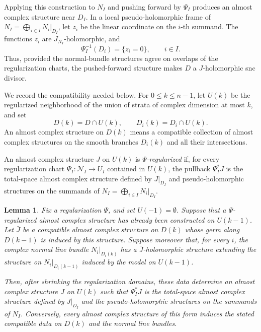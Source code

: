 \documentclass[11pt]{amsart}
\numberwithin{equation}{section}
\theoremstyle{plain}
\newtheorem{lemma}[theorem]{Lemma}
\theoremstyle{definition}
\newcommand{\cN}{\mathcal{N}}
\begin{document}
Applying this construction to $N_I$ and pushing forward by $\Psi_I$ produces
an almost complex structure near $D_I$. In a local pseudo-holomorphic frame of
$N_I=\bigoplus_{i\in I}N_i|_{D_I}$, let $z_i$ be the linear coordinate on the
$i$-th summand. The functions $z_i$ are $J_{N_I}$-holomorphic, and
\[
\Psi_I^{-1}(D_i)=\{z_i=0\},\qquad i\in I.
\]
Thus, provided the normal-bundle structures agree on overlaps of the
regularization charts, the pushed-forward structure makes $D$ a
$J$-holomorphic snc divisor.

We record the compatibility needed below. For $0\le k\le n-1$, let $U(k)$
be the regularized neighborhood of the union of strata of complex dimension
at most $k$, and set
\[
D(k)=D\cap U(k),\qquad D_i(k)=D_i\cap U(k).
\]
An almost complex structure on $D(k)$ means a compatible collection of almost
complex structures on the smooth branches $D_i(k)$ and all their
intersections.

An almost complex structure $J$ on $U(k)$ is
\emph{$\Psi$-regularized} if, for every regularization chart
$\Psi_I:\cN_I\to U_I$ contained in $U(k)$, the pullback $\Psi_I^*J$ is the
total-space almost complex structure defined by $J|_{D_I}$ and
pseudo-holomorphic structures on the summands of
$N_I=\bigoplus_{i\in I}N_i|_{D_I}$.

\begin{lemma}
\label{Lem: regularized local model} Fix a regularization $\Psi$, and set
$U(-1)=\emptyset$. Suppose that a $\Psi$-regularized almost complex structure
has already been constructed on $U(k-1)$. Let $\bar J$ be a compatible almost
complex structure on $D(k)$ whose germ along $D(k-1)$ is induced by this
structure. Suppose moreover that, for every $i$, the complex normal line bundle
$N_i|_{D_i(k)}$ has a $\bar J$-holomorphic structure extending the structure on
$N_i|_{D_i(k-1)}$ induced by the model on $U(k-1)$.

Then, after shrinking the regularization domains, these data determine an
almost complex structure $J$ on $U(k)$ such that $\Psi_I^*J$ is the
total-space almost complex structure defined by $\bar J|_{D_I}$ and the
pseudo-holomorphic structures on the summands of $N_I$. Conversely, every
almost complex structure of this form induces the stated compatible data on
$D(k)$ and the normal line bundles.
\end{lemma}
\end{document}
